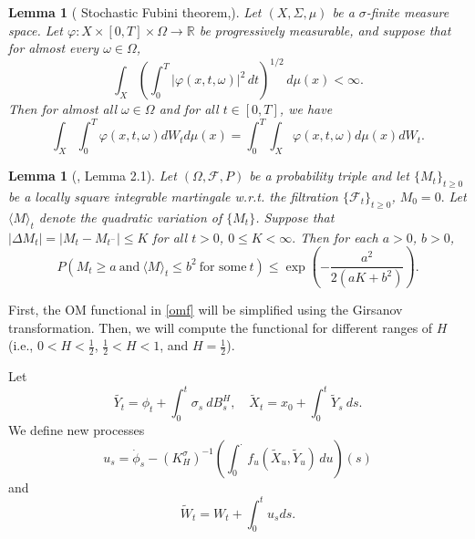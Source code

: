 \documentclass{article}
\newtheorem{lemma}[theorem]{Lemma}
\theoremstyle{definition}  %
\theoremstyle{plain}  %
\begin{document}
    
   \begin{lemma}[ Stochastic Fubini theorem,{\cite[Theorem 2.2]{Veraar01082012}}]\label{fubini}
   Let \((X, \Sigma, \mu)\) be a \(\sigma\)-finite measure space. Let \(\varphi: X \times [0,T] \times \Omega \to \mathbb{R}\) be progressively measurable, and suppose that for almost every \(\omega \in \Omega\),
\[
\int_X \left( \int_0^T |\varphi(x,t,\omega)|^2 \, dt \right)^{1/2} \, d\mu(x) < \infty.
\]
   	Then for almost all $\omega\in \Omega$ and for all $t\in [0,T]$, we have
   	\begin{equation*}
   		\int_X \int_0^T \varphi(x,t,\omega) dW_t d\mu(x)=\int_0^T \int_X \varphi(x,t,\omega) d\mu(x) dW_t .
   	\end{equation*}
   	  \end{lemma}
   
   
   
   
   
   
 \begin{lemma}[\cite{inequality}, Lemma 2.1]
    Let $(\Omega,\mathcal{F},P)$ be a probability triple and let $\{M_t\}_{t\geq 0}$ be a locally square integrable martingale w.r.t. the filtration 
    $\{\mathcal{F}_t\}_{t\geq 0}$, $M_0=0.$ 
    Let \(\langle M\rangle_t\) denote the quadratic variation of \(\{M_t\}\). Suppose that $|\Delta M_t|=|M_t-M_{t^-}|\leq K$ for all $t>0$, $0\leq K<\infty.$
    Then for each $a>0$, $b>0$,
    \begin{equation*}
        P(M_t\geq a \ \text{and} \ \langle M\rangle_t \leq b^2 \ \text{for some} \ t)
        \leq \exp\left(-\frac{a^2}{2(aK+b^2)}\right).
    \end{equation*}
    \label{exponential_ineq} %
\end{lemma}
   




First, the OM functional in \eqref{omf} will be simplified using the Girsanov transformation. Then, we will compute the functional for different ranges of \(H\) (i.e., \(0 < H < \frac{1}{2}\), \(\frac{1}{2} < H < 1\), and \(H = \frac{1}{2}\)).





Let 
\begin{equation}
    \tilde{Y_t}=\phi_t+\int_0^t \sigma_s\  dB^H_s,\quad \tilde{X}_t=x_0+\int_0^t  \tilde{Y}_s  \ ds. 
\end{equation}
We define new processes
\begin{equation}
     u_s=  \dot{\phi}_s 
        - (K_H^\sigma)^{-1}\!\left( \int_0^{\cdot} f_u(\tilde{X}_u,\tilde{Y}_u) \, du \right)(s) 
\end{equation}
and
\begin{equation}
    \tilde{W}_t 
    = W_t + \int_0^t 
   u_s ds. 
\end{equation}
\end{document}
